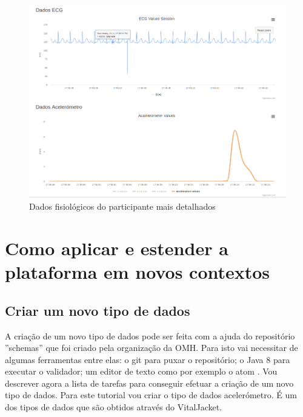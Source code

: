  \begin{figure}[H]
\centering
\includegraphics[width=1\textwidth]{imgs/withzoom-choosen-web.png}
\caption[Dados fisiológicos do participante mais detalhados]{Dados fisiológicos do participante mais detalhados}
\label{f:withzoom}
 \end{figure}
\section{Como aplicar e estender a plataforma em novos contextos}


\subsection{Criar um novo tipo de dados}

A criação de um novo tipo de dados pode ser feita com a ajuda do repositório ''schemas'' \cite{schemas-rep} que foi criado pela organização da \gls{OMH}. Para isto vai necessitar de algumas ferramentas entre elas: o git \cite{git-install} para puxar o repositório; o Java 8 \cite{java-overview} para executar o validador; um editor de texto como por exemplo o atom \cite{atom-install}. Vou descrever agora a lista de tarefas para conseguir efetuar a criação de um novo tipo de dados. Para este tutorial vou criar o tipo de dados acelerómetro. É um dos tipos de dados que são obtidos através do VitalJacket.

